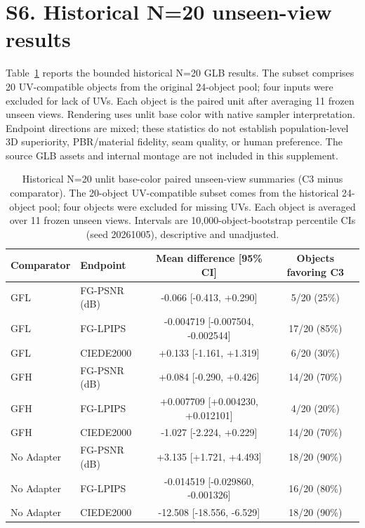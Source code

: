 \documentclass[11pt]{article}
\begin{document}



\section*{S6. Historical N=20 unseen-view results}
Table~\ref{tab:supp-n20} reports the bounded historical N=20 GLB results. The subset comprises 20 UV-compatible objects from the original 24-object pool; four inputs were excluded for lack of UVs. Each object is the paired unit after averaging 11 frozen unseen views. Rendering uses unlit base color with native sampler interpretation. Endpoint directions are mixed; these statistics do not establish population-level 3D superiority, PBR/material fidelity, seam quality, or human preference. The source GLB assets and internal montage are not included in this supplement.
\begin{table}[ht]
\centering\small
\caption{Historical N=20 unlit base-color paired unseen-view summaries (C3 minus comparator). The 20-object UV-compatible subset comes from the historical 24-object pool; four objects were excluded for missing UVs. Each object is averaged over 11 frozen unseen views. Intervals are 10,000-object-bootstrap percentile CIs (seed 20261005), descriptive and unadjusted.}\label{tab:supp-n20}
\begin{tabular}{llcc}\toprule Comparator & Endpoint & Mean difference [95\% CI] & Objects favoring C3 \\\midrule
GFL & FG-PSNR (dB) & -0.066 [-0.413, +0.290] & 5/20 (25\%) \\
GFL & FG-LPIPS & -0.004719 [-0.007504, -0.002544] & 17/20 (85\%) \\
GFL & CIEDE2000 & +0.133 [-1.161, +1.319] & 6/20 (30\%) \\
GFH & FG-PSNR (dB) & +0.084 [-0.290, +0.426] & 14/20 (70\%) \\
GFH & FG-LPIPS & +0.007709 [+0.004230, +0.012101] & 4/20 (20\%) \\
GFH & CIEDE2000 & -1.027 [-2.224, +0.229] & 14/20 (70\%) \\
No Adapter & FG-PSNR (dB) & +3.135 [+1.721, +4.493] & 18/20 (90\%) \\
No Adapter & FG-LPIPS & -0.014519 [-0.029860, -0.001326] & 16/20 (80\%) \\
No Adapter & CIEDE2000 & -12.508 [-18.556, -6.529] & 18/20 (90\%) \\
\bottomrule\end{tabular}
\end{table}
\end{document}
